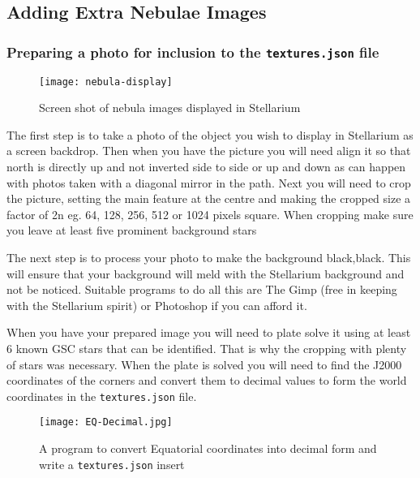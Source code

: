 \subsection{Adding Extra Nebulae
Images}\label{adding-extra-nebulae-images}

\subsubsection{\texorpdfstring{Preparing a photo for inclusion to the
\texttt{textures.json}
file}{Preparing a photo for inclusion to the textures.json file}}\label{preparing-a-photo-for-inclusion-to-the-textures.json-file}

\begin{figure}[h]
\centering\texttt{[image: nebula-display]}
\caption{Screen shot of nebula images displayed in Stellarium}
\end{figure}

The first step is to take a photo of the object you wish to display in
Stellarium as a screen backdrop. Then when you have the picture you will
need align it so that north is directly up and not inverted side to side
or up and down as can happen with photos taken with a diagonal mirror in
the path. Next you will need to crop the picture, setting the main
feature at the centre and making the cropped size a factor of 2n eg. 64,
128, 256, 512 or 1024 pixels square. When cropping make sure you leave
at least five prominent background stars

The next step is to process your photo to make the background
black,black. This will ensure that your background will meld with the
Stellarium background and not be noticed. Suitable programs to do all
this are The Gimp (free in keeping with the Stellarium spirit) or
Photoshop if you can afford it.

When you have your prepared image you will need to plate solve it using
at least 6 known GSC stars that can be identified. That is why the
cropping with plenty of stars was necessary. When the plate is solved
you will need to find the J2000 coordinates of the corners and convert
them to decimal values to form the world coordinates in the
\texttt{textures.json} file.

\begin{figure}[h]
\centering\texttt{[image: EQ-Decimal.jpg]}
\caption{A program to convert Equatorial coordinates into decimal
form and write a \texttt{textures.json} insert}
\end{figure}

